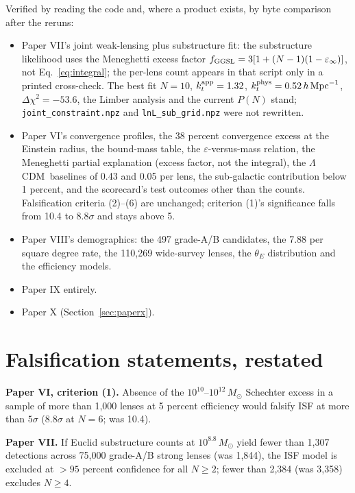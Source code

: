 \documentclass[twocolumn,11pt]{article}
\newcommand{\lcdm}{$\Lambda$CDM}
\newcommand{\Msun}{M_\odot}
\newcommand{\einf}{\varepsilon_\infty}
\begin{document}
Verified by reading the code and, where a product exists, by byte
comparison after the reruns:
\begin{itemize}[leftmargin=1.4em,itemsep=0.1em]
\item Paper VII's joint weak-lensing plus substructure fit: the
  substructure likelihood uses the Meneghetti excess factor
  $f_{\rm GGSL}=3[1+(N-1)(1-\einf)]$, not Eq.~\ref{eq:integral}; the
  per-lens count appears in that script only in a printed cross-check.
  The best fit $N=10$, $k_t^{\rm app}=1.32$, $k_t^{\rm phys}=0.52\,h\,{\rm
  Mpc}^{-1}$, $\Delta\chi^2=-53.6$, the Limber analysis and the current
  $P(N)$ stand; \texttt{joint\_constraint.npz} and
  \texttt{lnL\_sub\_grid.npz} were not rewritten.
\item Paper VI's convergence profiles, the 38 percent convergence
  excess at the Einstein radius, the bound-mass table, the
  $\varepsilon$-versus-mass relation, the Meneghetti partial
  explanation (excess factor, not the integral), the \lcdm\ baselines
  of 0.43 and 0.05 per lens, the sub-galactic contribution below 1
  percent, and the scorecard's test outcomes other than the counts.
  Falsification criteria (2)--(6) are unchanged; criterion (1)'s
  significance falls from 10.4 to 8.8$\sigma$ and stays above 5.
\item Paper VIII's demographics: the 497 grade-A/B candidates, the
  7.88 per square degree rate, the 110,269 wide-survey lenses, the
  $\theta_E$ distribution and the efficiency models.
\item Paper IX entirely.
\item Paper X (Section~\ref{sec:paperx}).
\end{itemize}

\section{Falsification statements, restated}
\label{sec:falsification}

\textbf{Paper VI, criterion (1).} Absence of the $10^{10}$--$10^{12}\,\Msun$
Schechter excess in a sample of more than 1,000 lenses at 5 percent
efficiency would falsify ISF at more than $5\sigma$ (8.8$\sigma$ at
$N=6$; was 10.4).

\textbf{Paper VII.} If Euclid substructure counts at
$10^{8.8}\,\Msun$ yield fewer than 1,307 detections across 75,000
grade-A/B strong lenses (was 1,844), the ISF model is excluded at
$>95$ percent confidence for all $N\geq2$; fewer than 2,384 (was 3,358)
excludes $N\geq4$.
\end{document}
